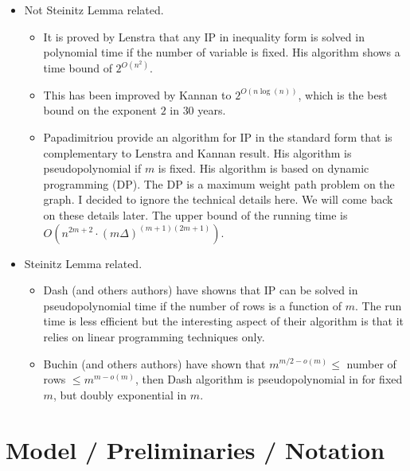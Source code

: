 \documentclass[12pt]{article}
\theoremstyle{definition}
\begin{document}
\begin{itemize}
	\item Not Steinitz Lemma related.
	\begin{itemize}
		\item It is proved by Lenstra that any IP in inequality form is solved in polynomial time if the number of variable is fixed. His algorithm shows a time bound of $2^{O(n^2)}$.
		\item This has been improved by Kannan to $2^{O(n \log(n))}$, which is the best bound on the exponent $2$ in $30$ years.
		\item Papadimitriou provide an algorithm for IP in the standard form that is complementary to Lenstra and Kannan result. His algorithm is pseudopolynomial if $m$ is fixed. His algorithm is based on dynamic programming (DP). The DP is a maximum weight path problem on the graph. I decided to ignore the technical details here. We will come back on these details later. The upper bound of the running time is $O(n^{2m+2} \cdot (m \Delta) ^ {(m+1)(2m+1)})$.
	\end{itemize}
	\item Steinitz Lemma related.
	\begin{itemize}
		\item Dash (and others authors) have showns that IP can be solved in pseudopolynomial time if the number of rows is a function of $m$. The run time is less efficient but the interesting aspect of their algorithm is that it relies on linear programming techniques only.
		\item Buchin (and others authors) have shown that $m^{m/2-o(m)} \leq$ number of rows $\leq m^{m-o(m)}$, then Dash algorithm is pseudopolynomial in for fixed $m$, but doubly exponential in $m$. 
	\end{itemize}
\end{itemize}

\section{Model / Preliminaries / Notation}
\end{document}

